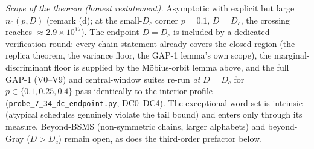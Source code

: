 \documentclass[
]{article}
\begin{document}
\emph{Scope of the theorem (honest restatement).} Asymptotic with explicit but large $n_0(p,D)$
(remark (d); at the small-$D_c$ corner $p=0.1$, $D=D_c$, the crossing reaches $\approx2.9\times
10^{17}$). The endpoint $D=D_c$ is included by a dedicated verification round: every chain statement
already covers the closed region (the replica theorem, the variance floor, the GAP-1 lemma's own
scope), the marginal-discriminant floor is supplied by the M\"obius-orbit lemma above, and the full
GAP-1 (V0--V9) and central-window suites re-run \emph{at} $D=D_c$ for $p\in\{0.1,0.25,0.4\}$ pass
identically to the interior profile (\texttt{probe\_7\_34\_dc\_endpoint.py}, DC0--DC4). The
exceptional word set is intrinsic (atypical schedules genuinely violate the
tail bound) and enters only through its measure. Beyond-BSMS (non-symmetric chains, larger alphabets)
and beyond-Gray ($D>D_c$) remain open, as does the third-order prefactor below.
\end{document}
